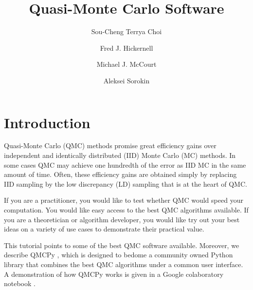 \documentclass[graybox,footinfo]{svmult}
\begin{document}
\title*{Quasi-Monte Carlo Software}
\author{Sou-Cheng Terrya Choi \and Fred J. Hickernell \and Michael J. McCourt \and Aleksei Sorokin}

\maketitle




\section{Introduction}
Quasi-Monte Carlo (QMC) methods promise great efficiency gains over independent and identically distributed (IID) Monte Carlo (MC) methods.  In some cases QMC may achieve one hundredth of the error as IID MC in the same amount of time. Often, these efficiency gains are obtained simply by  replacing IID sampling by the low discrepancy (LD) sampling that is at the heart of QMC. 

If you are a practitioner, you would like to test whether QMC would speed your computation.  You would like easy access to the best QMC algorithms available.  If you are a theoretician or algorithm developer, you would like try out your best ideas on a variety of use cases to demonstrate their practical value.  

This tutorial points to some of the best QMC software available.  Moreover, we describe QMCPy \cite{QMCPy2020a}, which is designed to bedome a community owned Python library that combines the best QMC algorithms under a common user interface.  A demonstration of how QMCPy works is given in a Google colaboratory notebook \cite{QMCPyTutColab2020}.
\end{document}
